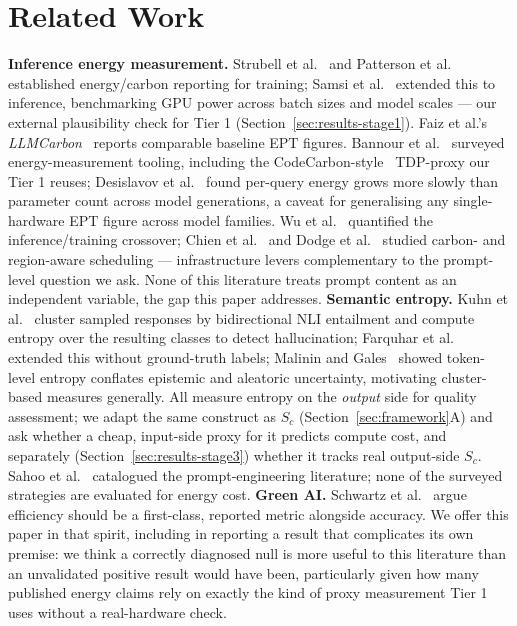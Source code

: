 \documentclass[conference]{IEEEtran}
\begin{document}
\section{Related Work}
\label{sec:related}
\textbf{Inference energy measurement.} Strubell et
al.~\cite{strubell2019energy} and Patterson et
al.~\cite{patterson2022carbon} established energy/carbon reporting for
training; Samsi et al.~\cite{samsi2023words} extended this to
inference, benchmarking GPU power across batch sizes and model scales
--- our external plausibility check for Tier 1
(Section~\ref{sec:results-stage1}). Faiz et al.'s
\emph{LLMCarbon}~\cite{faiz2024llmcarbon} reports comparable baseline
EPT figures. Bannour et al.~\cite{bannour2021evaluating} surveyed
energy-measurement tooling, including the
CodeCarbon-style~\cite{lacoste2019quantifying} TDP-proxy our Tier 1
reuses; Desislavov et al.~\cite{desislavov2023trends} found per-query
energy grows more slowly than parameter count across model
generations, a caveat for generalising any single-hardware EPT figure
across model families. Wu et al.~\cite{wu2022sustainable} quantified
the inference/training crossover; Chien et
al.~\cite{chien2023reducing} and Dodge et al.~\cite{dodge2022measuring}
studied carbon- and region-aware scheduling --- infrastructure levers
complementary to the prompt-level question we ask. None of this
literature treats prompt content as an independent variable, the gap
this paper addresses.
\textbf{Semantic entropy.} Kuhn et al.~\cite{kuhn2023semantic} cluster
sampled responses by bidirectional NLI entailment and compute entropy
over the resulting classes to detect hallucination; Farquhar et
al.~\cite{farquhar2024detecting} extended this without ground-truth
labels; Malinin and Gales~\cite{malinin2021uncertainty} showed
token-level entropy conflates epistemic and aleatoric uncertainty,
motivating cluster-based measures generally. All measure entropy on
the \emph{output} side for quality assessment; we adapt the same
construct as $S_c$ (Section~\ref{sec:framework}A) and ask whether a
cheap, input-side proxy for it predicts compute cost, and separately
(Section~\ref{sec:results-stage3}) whether it tracks real output-side
$S_c$. Sahoo et al.~\cite{sahoo2024systematic} catalogued the
prompt-engineering literature; none of the surveyed strategies are
evaluated for energy cost.
\textbf{Green AI.} Schwartz et al.~\cite{schwartz2020green} argue
efficiency should be a first-class, reported metric alongside
accuracy. We offer this paper in that spirit, including in reporting a
result that complicates its own premise: we think a correctly
diagnosed null is more useful to this literature than an unvalidated
positive result would have been, particularly given how many published
energy claims rely on exactly the kind of proxy measurement Tier 1
uses without a real-hardware check.
\end{document}
